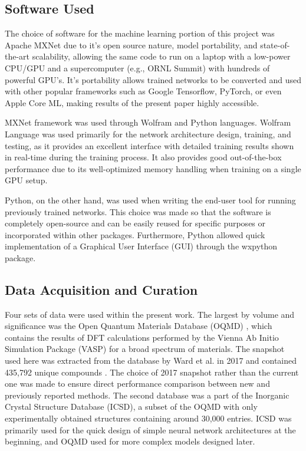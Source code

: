 \subsection{Software Used} \label{sipfenn:sssec:SoftwareUsed}

The choice of software for the machine learning portion of this project was Apache MXNet \cite{ChenMXNet:Systems} due to it's open source nature, model portability, and state-of-the-art scalability, allowing the same code to run on a laptop with a low-power CPU/GPU and a supercomputer (e.g., ORNL Summit) with hundreds of powerful GPU's. It's portability allows trained networks to be converted and used with other popular frameworks such as Google Tensorflow, PyTorch, or even Apple Core ML, making results of the present paper highly accessible.

MXNet framework was used through Wolfram and Python languages. Wolfram Language was used primarily for the network architecture design, training, and testing, as it provides an excellent interface with detailed training results shown in real-time during the training process. It also provides good out-of-the-box performance due to its well-optimized memory handling when training on a single GPU setup. 

Python, on the other hand, was used when writing the end-user tool for running previously trained networks. This choice was made so that the software is completely open-source and can be easily reused for specific purposes or incorporated within other packages. Furthermore, Python allowed quick implementation of a Graphical User Interface (GUI) through the wxpython package.

\subsection{Data Acquisition and Curation} \label{sipfenn:sssec:Data}

Four sets of data were used within the present work. The largest by volume and significance was the Open Quantum Materials Database (OQMD) \cite{Kirklin2015TheEnergies, Saal2013MaterialsOQMD}, which contains the results of DFT calculations performed by the Vienna Ab Initio Simulation Package (VASP) \cite{Kresse1993AbMetals} for a broad spectrum of materials. The snapshot used here was extracted from the database by Ward et al. in 2017 and contained 435,792 unique compounds \cite{Ward2017IncludingTessellations}. The choice of 2017 snapshot rather than the current one was made to ensure direct performance comparison between new and previously reported methods. The second database was a part of the Inorganic Crystal Structure Database (ICSD), a subset of the OQMD with only experimentally obtained structures containing around 30,000 entries. ICSD was primarily used for the quick design of simple neural network architectures at the beginning, and OQMD used for more complex models designed later. 

